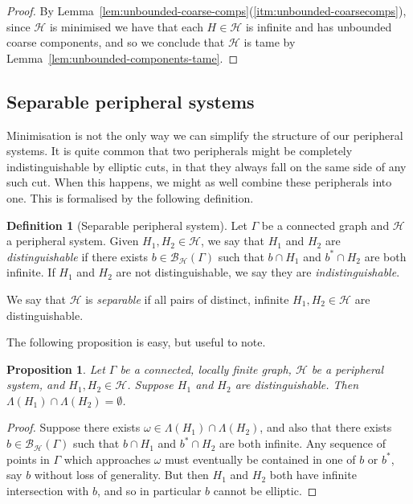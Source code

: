 \documentclass[11pt,a4paper]{amsart}
\newtheorem{proposition}[theorem]{Proposition}
\theoremstyle{definition}
\newtheorem{definition}[theorem]{Definition}
\newcommand{\per}{\mathcal{H}}
\newcommand{\br}{{\mathscr{B}}}
\begin{document}
\begin{proof}
    By Lemma~\ref{lem:unbounded-coarse-comps}(\ref{itm:unbounded-coarsecomps}), since $\per$ is minimised we have that each $H \in \per$ is infinite and has unbounded coarse components, and so we conclude that $\per$ is tame by Lemma~\ref{lem:unbounded-components-tame}.
\end{proof}





\subsection{Separable peripheral systems}

Minimisation is not the only way we can simplify the structure of our peripheral systems. It is quite common that two peripherals might be completely indistinguishable by elliptic cuts, in that they always fall on the same side of any such cut. When this happens, we might as well combine these peripherals into one. This is formalised by the following definition.



\begin{definition}[Separable peripheral system]
    Let $\Gamma$ be a connected graph and $\per$ a peripheral system. Given $H_1, H_2 \in \per$, we say that $H_1$ and $H_2$ are \emph{distinguishable} if there exists $b \in \br_\per(\Gamma)$ such that $b \cap H_1$ and $b^\ast \cap H_2$ are both infinite. If $H_1$ and $H_2$ are not distinguishable, we say they are \emph{indistinguishable}. 
    
    We say that $\per$ is \emph{separable} if all pairs of distinct, infinite $H_1, H_2 \in \per$ are distinguishable.
\end{definition}

The following proposition is easy, but useful to note.

\begin{proposition}\label{prop:distinguishable-disjointlimset}
    Let $\Gamma$ be a connected, locally finite graph, $\per$ be a peripheral system, and $H_1, H_2 \in \per$. 
    Suppose $H_1$ and $H_2$ are distinguishable. Then $\Lambda(H_1) \cap \Lambda(H_2) = \emptyset$. 
\end{proposition}

\begin{proof}
    Suppose there exists $\omega \in\Lambda(H_1) \cap \Lambda(H_2) $, and also that there exists $b \in \br_\per (\Gamma)$ such that $b \cap H_1$ and $b^\ast \cap H_2$ are both infinite. Any sequence of points in $\Gamma$ which approaches $\omega$ must eventually  be contained in one of $b$ or $b ^\ast$, say $b$ without loss of generality. But then $H_1$ and $H_2$ both have infinite intersection with $b$, and so in particular $b$ cannot be elliptic. 
\end{proof}
\end{document}
